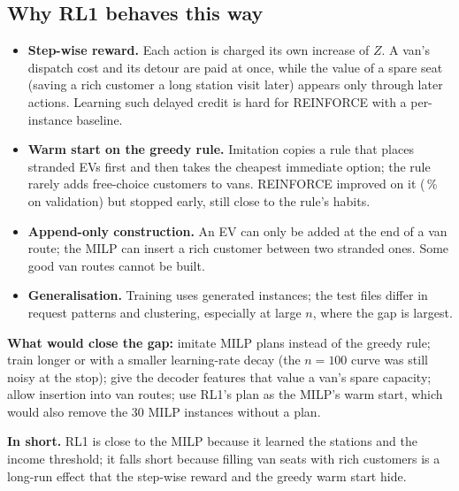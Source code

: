 \documentclass[11pt,a4paper]{article}
\newcommand{\inshort}[1]{\begin{insum}\textbf{In short.} #1\end{insum}}
\newcommand{\pct}{\,\%}
\begin{document}
\subsection{Why RL1 behaves this way}
\label{sec:why}
\begin{itemize}
  \item \textbf{Step-wise reward.} Each action is charged its own increase of $Z$. A van's dispatch cost and its detour are paid at once, while the value of a spare seat (saving a rich customer a long station visit later) appears only through later actions. Learning such delayed credit is hard for REINFORCE with a per-instance baseline.
  \item \textbf{Warm start on the greedy rule.} Imitation copies a rule that places stranded EVs first and then takes the cheapest immediate option; the rule rarely adds free-choice customers to vans. REINFORCE improved on it (\BestValPct\pct{} on validation) but stopped early, still close to the rule's habits.
  \item \textbf{Append-only construction.} An EV can only be added at the end of a van route; the MILP can insert a rich customer between two stranded ones. Some good van routes cannot be built.
  \item \textbf{Generalisation.} Training uses generated instances; the test files differ in request patterns and clustering, especially at large $n$, where the gap is largest.
\end{itemize}
\textbf{What would close the gap:} imitate MILP plans instead of the greedy rule; train longer or with a smaller learning-rate decay (the $n=100$ curve was still noisy at the stop); give the decoder features that value a van's spare capacity; allow insertion into van routes; use RL1's plan as the MILP's warm start, which would also remove the 30 MILP instances without a plan.

\inshort{RL1 is close to the MILP because it learned the stations and the income threshold; it falls short because filling van seats with rich customers is a long-run effect that the step-wise reward and the greedy warm start hide.}

\end{document}
